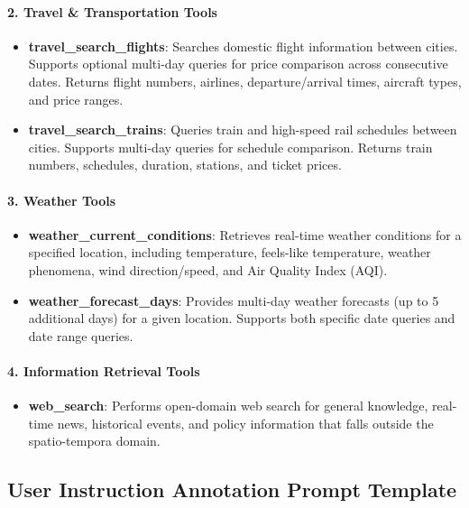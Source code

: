 \documentclass{article} %
\begin{document}
\paragraph{2. Travel \& Transportation Tools}
\begin{itemize}
    \item \textbf{travel\_search\_flights}: Searches domestic flight information between cities. Supports optional multi-day queries for price comparison across consecutive dates. Returns flight numbers, airlines, departure/arrival times, aircraft types, and price ranges.
    \item \textbf{travel\_search\_trains}: Queries train and high-speed rail schedules between cities. Supports multi-day queries for schedule comparison. Returns train numbers, schedules, duration, stations, and ticket prices.
\end{itemize}

\paragraph{3. Weather Tools}
\begin{itemize}
    \item \textbf{weather\_current\_conditions}: Retrieves real-time weather conditions for a specified location, including temperature, feels-like temperature, weather phenomena, wind direction/speed, and Air Quality Index (AQI).
    \item \textbf{weather\_forecast\_days}: Provides multi-day weather forecasts (up to 5 additional days) for a given location. Supports both specific date queries and date range queries.
\end{itemize}

\paragraph{4. Information Retrieval Tools}
\begin{itemize}
    \item \textbf{web\_search}: Performs open-domain web search for general knowledge, real-time news, historical events, and policy information that falls outside the spatio-tempora domain.
\end{itemize}


\subsection{User Instruction Annotation Prompt Template}
\label{app:intent_classification_prompt}
\end{document}
